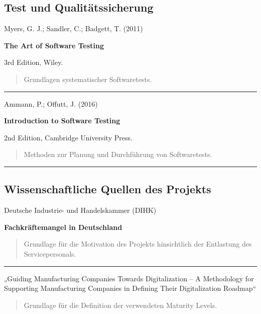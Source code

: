 \subsection{Test und
Qualitätssicherung}\label{test-und-qualituxe4tssicherung}

Myers, G. J.; Sandler, C.; Badgett, T. (2011)

\textbf{The Art of Software Testing}

3rd Edition, Wiley.

\begin{quote}
Grundlagen systematischer Softwaretests.
\end{quote}

\begin{center}\rule{0.5\linewidth}{0.5pt}\end{center}

Ammann, P.; Offutt, J. (2016)

\textbf{Introduction to Software Testing}

2nd Edition, Cambridge University Press.

\begin{quote}
Methoden zur Planung und Durchführung von Softwaretests.
\end{quote}

\begin{center}\rule{0.5\linewidth}{0.5pt}\end{center}

\subsection{Wissenschaftliche Quellen des
Projekts}\label{wissenschaftliche-quellen-des-projekts}

Deutsche Industrie- und Handelskammer (DIHK)

\textbf{Fachkräftemangel in Deutschland}

\begin{quote}
Grundlage für die Motivation des Projekts hinsichtlich der Entlastung
des Servicepersonals.
\end{quote}

\begin{center}\rule{0.5\linewidth}{0.5pt}\end{center}

„Guiding Manufacturing Companies Towards Digitalization -- A Methodology
for Supporting Manufacturing Companies in Defining Their Digitalization
Roadmap``

\begin{quote}
Grundlage für die Definition der verwendeten Maturity Levels.
\end{quote}

